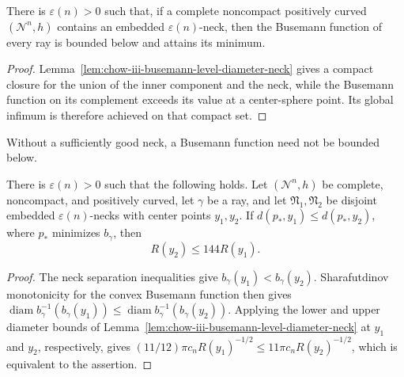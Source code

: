 \begin{lemma}
\label{lem:chow-iii-busemann-attains-minimum}


There is \(\varepsilon(n)>0\) such that, if a complete noncompact positively
curved \((\mathcal N^n,h)\) contains an embedded \(\varepsilon(n)\)-neck,
then the Busemann function of every ray is bounded below and attains its
minimum.
\end{lemma}
\begin{proof}
\sketch Lemma~\ref{lem:chow-iii-busemann-level-diameter-neck} gives a compact
closure for the union of the inner component and the neck, while the Busemann
function on its complement exceeds its value at a center-sphere point.  Its
global infimum is therefore achieved on that compact set.
\end{proof}

\begin{remark}
\label{rem:chow-iii-busemann-minimum-neck-essential}

Without a sufficiently good neck, a Busemann function need not be bounded
below.
\end{remark}

\begin{proposition}
\label{prop:chow-iii-farther-necks-larger-radii}


There is \(\varepsilon(n)>0\) such that the following holds.  Let
\((\mathcal N^n,h)\) be complete, noncompact, and positively curved, let
\(\gamma\) be a ray, and let \(\mathfrak N_1,\mathfrak N_2\) be disjoint
embedded \(\varepsilon(n)\)-necks with center points \(y_1,y_2\).  If
\(d(p_*,y_1)\le d(p_*,y_2)\), where \(p_*\) minimizes \(b_\gamma\), then
\[
 R(y_2)\le144R(y_1).
\]
\end{proposition}
\begin{proof}
\sketch The neck separation inequalities give \(b_\gamma(y_1)<b_\gamma(y_2)\).
Sharafutdinov monotonicity for the convex Busemann function then gives
\(\operatorname{diam}b_\gamma^{-1}(b_\gamma(y_1))\le
\operatorname{diam}b_\gamma^{-1}(b_\gamma(y_2))\).  Applying the lower and
upper diameter bounds of Lemma~\ref{lem:chow-iii-busemann-level-diameter-neck}
at \(y_1\) and \(y_2\), respectively, gives
\((11/12)\pi c_nR(y_1)^{-1/2}\le11\pi c_nR(y_2)^{-1/2}\), which is equivalent
to the assertion.
\end{proof}

